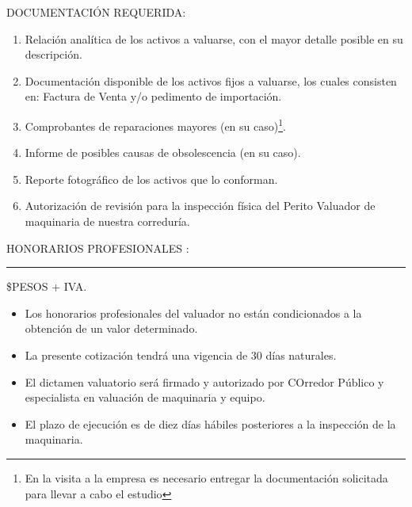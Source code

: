 \textcolor{principal}{DOCUMENTACI\'ON REQUERIDA:}
	\begin{enumerate}[1.]
		\item  Relaci\'on anal\'itica de los activos a valuarse, con el mayor detalle posible en su descripci\'on.
		\item Documentaci\'on disponible de los activos fijos a valuarse, los cuales consisten en: \textcolor{principal}{Factura de Venta y/o pedimento de importaci\'on.}
		\item Comprobantes de reparaciones mayores (en su caso)\footnote{En la visita a la empresa es necesario entregar la documentaci\'on solicitada para llevar a cabo el estudio}.  
		\item Informe de posibles causas de obsolescencia (en su caso).
		\item Reporte fotogr\'afico de los activos que lo conforman.
		\item \textcolor{principal}{Autorizaci\'on de revisi\'on para la inspecci\'on f\'isica del Perito Valuador de maquinaria de nuestra corredur\'ia.}
	\end{enumerate}

\vspace{1cm}

\textcolor{principal}{HONORARIOS PROFESIONALES : \rule{6cm}{.4pt} \$\importeCotizacion PESOS + IVA. }
\begin{itemize}
	\item Los honorarios profesionales del valuador no est\'an condicionados a la obtenci\'on de un valor determinado.
	\item La presente cotizaci\'on tendr\'a una vigencia de 30 d\'ias naturales.
	\item El dictamen valuatorio ser\'a firmado y autorizado por \textcolor{principal}{COrredor P\'ublico y especialista en valuaci\'on de maquinaria y equipo.}
	\item El plazo de ejecuci\'on es de diez d\'ias h\'abiles posteriores a la inspecci\'on de la maquinaria.
\end{itemize}

\vspace{1cm}

